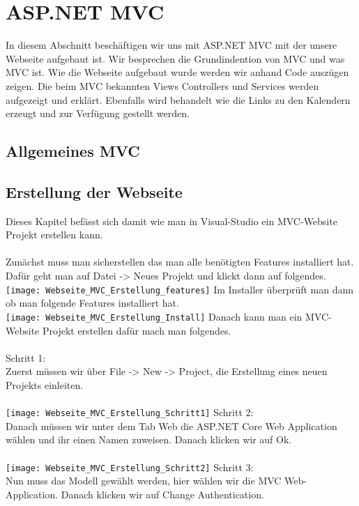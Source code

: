 {\section{ASP.NET MVC}
\label{sec:MVC}
In diesem Abschnitt beschäftigen wir uns mit ASP.NET MVC mit der unsere Webseite aufgebaut ist. Wir besprechen die Grundindention von MVC und was MVC ist. Wie die Webseite aufgebaut wurde werden wir anhand Code auszügen zeigen. Die beim MVC bekannten Views Controllers und Services werden aufgezeigt und erklärt. Ebenfalls wird behandelt wie die Links zu den Kalendern erzeugt und zur Verfügung gestellt werden. 

\subsection{Allgemeines MVC}
\label{sec:allgemein}
\subsection{Erstellung der Webseite}
Dieses Kapitel befässt sich damit wie man in Visual-Studio ein MVC-Website Projekt erstellen kann.\\ \\
Zunächst muss man sicherstellen das man alle benötigten Features installiert hat. Dafür geht man auf Datei -> Neues Projekt und klickt dann auf folgendes.\\
\texttt{[image: Webseite\_MVC\_Erstellung\_features]}
Im Installer überprüft man dann ob man folgende Features installiert hat.\\
\texttt{[image: Webseite\_MVC\_Erstellung\_Install]}
Danach kann man ein MVC-Website Projekt erstellen dafür mach man folgendes.\\ \\
Schritt 1:\\
Zuerst müssen wir über File -> New -> Project, die Erstellung eines neuen Projekts einleiten.\\ \\
\texttt{[image: Webseite\_MVC\_Erstellung\_Schritt1]}
Schritt 2:\\
Danach müssen wir unter dem Tab Web die ASP.NET Core Web Application wählen und ihr einen Namen zuweisen. Danach klicken wir auf Ok.\\ \\
\texttt{[image: Webseite\_MVC\_Erstellung\_Schritt2]}
Schritt 3:\\
Nun muss das Modell gewählt werden, hier wählen wir die MVC Web-Application. Danach klicken wir auf Change Authentication. \\ \\
}
